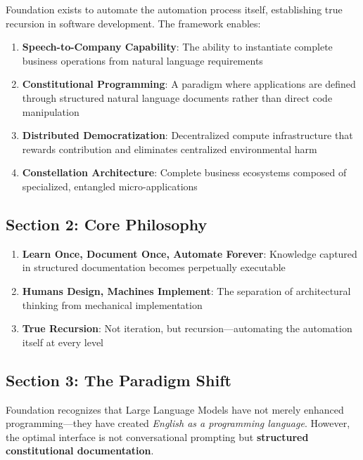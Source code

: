 \documentclass[12pt,letterpaper]{article}
\begin{document}
Foundation exists to automate the automation process itself, establishing true recursion in software development. The framework enables:

\begin{enumerate}[label=\alph*)]
    \item \textbf{Speech-to-Company Capability}: The ability to instantiate complete business operations from natural language requirements
    \item \textbf{Constitutional Programming}: A paradigm where applications are defined through structured natural language documents rather than direct code manipulation
    \item \textbf{Distributed Democratization}: Decentralized compute infrastructure that rewards contribution and eliminates centralized environmental harm
    \item \textbf{Constellation Architecture}: Complete business ecosystems composed of specialized, entangled micro-applications
\end{enumerate}

\subsection{Section 2: Core Philosophy}

\begin{tcolorbox}[colback=secondarygreen!10,colframe=secondarygreen,title=The Three Pillars]
\begin{enumerate}
    \item \textbf{Learn Once, Document Once, Automate Forever}: Knowledge captured in structured documentation becomes perpetually executable
    \item \textbf{Humans Design, Machines Implement}: The separation of architectural thinking from mechanical implementation
    \item \textbf{True Recursion}: Not iteration, but recursion—automating the automation itself at every level
\end{enumerate}
\end{tcolorbox}

\subsection{Section 3: The Paradigm Shift}

Foundation recognizes that Large Language Models have not merely enhanced programming—they have created \textit{English as a programming language}. However, the optimal interface is not conversational prompting but \textbf{structured constitutional documentation}.
\end{document}
